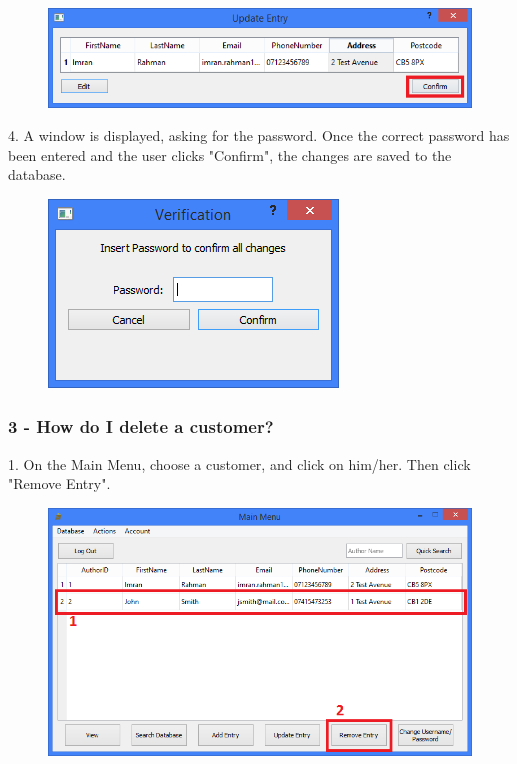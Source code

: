 \begin{figure}[H]
    \includegraphics[width=\textwidth]{./Manual/Tutorial/Q2/Confirm.png}
\end{figure}

4. A window is displayed, asking for the password. Once the correct password has been entered and the user clicks "Confirm", the changes are saved to the database.

\begin{figure}[H]
    \includegraphics[width=\textwidth]{./Manual/Tutorial/Q2/Verification.png}
\end{figure}

\subsubsection{3 -  How do I delete a customer?} \label{sssec:Q3}

1. On the Main Menu, choose a customer, and click on him/her. Then click "Remove Entry".

\begin{figure}[H]
    \includegraphics[width=\textwidth]{./Manual/Tutorial/Q3/SelectingCustomer.png}
\end{figure}

